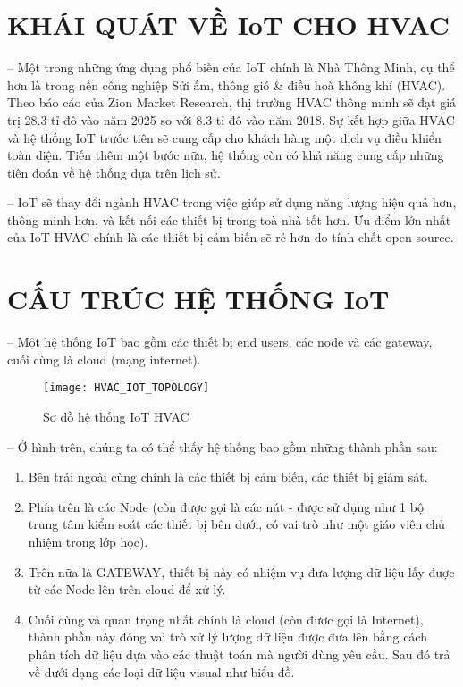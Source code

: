 \fancyhead[L]{\leftmark}
\section{KHÁI QUÁT VỀ IoT CHO HVAC}
-- Một trong những ứng dụng phổ biến của IoT chính là Nhà Thông Minh, cụ thể hơn là trong nền công nghiệp Sửi ấm, thông gió \& điều hoà không khí (HVAC). Theo báo cáo của Zion Market Research, thị trường HVAC thông minh sẽ đạt giá trị 28.3 tỉ đô vào năm 2025 so với 8.3 tỉ đô vào năm 2018. Sự kết hợp giữa HVAC và hệ thống IoT trước tiên sẽ cung cấp cho khách hàng một dịch vụ điều khiển toàn diện. Tiến thêm một bước nữa, hệ thống còn có khả năng cung cấp những tiên đoán về hệ thống dựa trên lịch sử.

-- IoT sẽ thay đổi ngành HVAC trong việc giúp sử dụng năng lượng hiệu quả hơn, thông minh hơn, và kết nối các thiết bị trong toà nhà tốt hơn. Ưu điểm lớn nhất của IoT HVAC chính là các thiết bị cảm biến sẽ rẻ hơn do tính chất open source.

\section{CẤU TRÚC HỆ THỐNG IoT}
-- Một hệ thống IoT bao gồm các thiết bị end users, các node và các gateway, cuối cùng là cloud (mạng internet). 
\begin{figure}[H]
	\centering
	\texttt{[image: HVAC\_IOT\_TOPOLOGY]}
	\caption{Sơ đồ hệ thống IoT HVAC}
\end{figure}
-- Ở hình trên, chúng ta có thể thấy hệ thống bao gồm những thành phần sau:
\begin{enumerate}
	\item Bên trái ngoài cùng chính là các thiết bị cảm biến, các thiết bị giám sát.
	\item Phía trên là các Node (còn được gọi là các nút - được sử dụng như 1 bộ trung tâm kiểm soát các thiết bị bên dưới, có vai trò như một giáo viên chủ nhiệm trong lớp học).
	\item Trên nữa là GATEWAY, thiết bị này có nhiệm vụ đưa lượng dữ liệu lấy được từ các Node lên trên cloud để xử lý.
	\item Cuối cùng và quan trọng nhất chính là cloud (còn được gọi là Internet), thành phần này đóng vai trò xử lý lượng dữ liệu được đưa lên bằng cách phân tích dữ liệu dựa vào các thuật toán mà người dùng yêu cầu. Sau đó trả về dưới dạng các loại dữ liệu visual như biểu đồ.
\end{enumerate}

